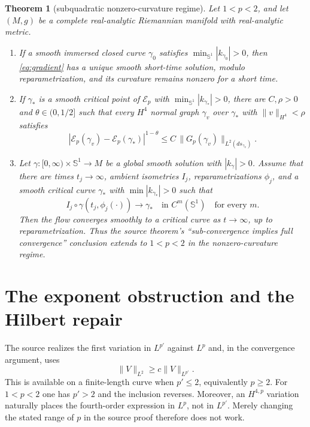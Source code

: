 \documentclass[11pt]{article}
\newtheorem{theorem}{Theorem}
\newcommand{\E}{\mathcal E_p}
\newcommand{\Sone}{\mathbb S^1}
\begin{document}
\begin{theorem}[subquadratic nonzero-curvature regime]\label{thm:main}
Let $1<p<2$, and let $(M,g)$ be a complete real-analytic Riemannian manifold
with real-analytic metric.
\begin{enumerate}[label=\textup{(\roman*)}]
\item If a smooth immersed closed curve $\gamma_0$ satisfies
$\min_{\Sone}|k_{\gamma_0}|>0$, then \eqref{eq:gradient} has a unique smooth
short-time solution, modulo reparametrization, and its curvature remains
nonzero for a short time.
\item If $\gamma_*$ is a smooth critical point of $\E$ with
$\min_{\Sone}|k_{\gamma_*}|>0$, there are $C,\rho>0$ and
$\theta\in(0,1/2]$ such that every $H^4$ normal graph $\gamma_v$ over
$\gamma_*$ with $\|v\|_{H^4}<\rho$ satisfies
\begin{equation}\label{eq:LS}
 |\E(\gamma_v)-\E(\gamma_*)|^{1-\theta}
 \le C\,\|G_p(\gamma_v)\|_{L^2(ds_{\gamma_v})}.
\end{equation}
\item Let $\gamma:[0,\infty)\times\Sone\to M$ be a global smooth solution
with $|k_\gamma|>0$.  Assume that there are times $t_j\to\infty$, ambient
isometries $I_j$, reparametrizations $\phi_j$, and a smooth critical curve
$\gamma_*$ with $\min|k_{\gamma_*}|>0$ such that
\[
 I_j\circ\gamma(t_j,\phi_j(\cdot))\longrightarrow\gamma_*
 \quad\text{in }C^m(\Sone)\quad\text{for every }m.
\]
Then the flow converges smoothly to a critical curve as $t\to\infty$, up to
reparametrization.  Thus the source theorem's ``sub-convergence implies full
convergence'' conclusion extends to $1<p<2$ in the nonzero-curvature regime.
\end{enumerate}
\end{theorem}

\section*{The exponent obstruction and the Hilbert repair}

The source realizes the first variation in $L^{p'}$ against $L^p$ and, in
the convergence argument, uses
\[
 \|V\|_{L^2}\ge c\|V\|_{L^{p'}}.
\]
This is available on a finite-length curve when $p'\le2$, equivalently
$p\ge2$.  For $1<p<2$ one has $p'>2$ and the inclusion reverses.  Moreover,
an $H^{4,p}$ variation naturally places the fourth-order expression in
$L^p$, not in $L^{p'}$.  Merely changing the stated range of $p$ in the
source proof therefore does not work.
\end{document}
